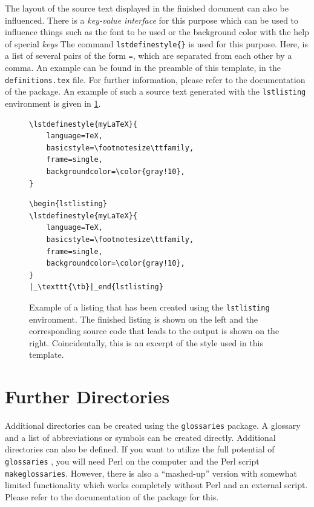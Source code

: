 The layout of the source text displayed in the finished document can also be 
influenced. There is a  \emph{key-value interface} for this purpose which can be 
used to influence things such as the font to be used or the background color 
with the help of special \emph{keys} The command
\texttt{\tb lstdefinestyle\{\}} is used for this purpose. Here, 
 is a list of several pairs of the form 
\texttt{=}, which are separated from each other by a 
comma. An example can be found in the preamble of this template, in the 
\texttt{definitions.tex} file. For further information, please refer to the 
documentation of the package. An example of such a source text generated with 
the \texttt{lstlisting} environment is given in  \cref{fig:listing}.
%
\begin{figure}[htb]
	\centering
	\begin{minipage}{.485\textwidth}
		\begin{lstlisting}
\lstdefinestyle{myLaTeX}{
	language=TeX,
	basicstyle=\footnotesize\ttfamily,
	frame=single,
	backgroundcolor=\color{gray!10},
}
		\end{lstlisting}
	\end{minipage}
	\hfill
	\begin{minipage}{.485\textwidth}
		\begin{lstlisting}[style=myBasic]
\begin{lstlisting}
\lstdefinestyle{myLaTeX}{
	language=TeX,
	basicstyle=\footnotesize\ttfamily,
	frame=single,
	backgroundcolor=\color{gray!10},
}
|_\texttt{\tb}|_end{lstlisting}
		\end{lstlisting}
	\end{minipage}
	\caption[Example of a listing]{%
		Example of a listing that has been created using the 
		\texttt{lstlisting} environment. The finished listing is shown on the 
		left and the corresponding source code that leads to the output is shown 
		on the right. Coincidentally, this is an excerpt of the style used in 
		this template.
	}\label{fig:listing}
\end{figure}
%
%
\section{Further Directories}
Additional directories can be created using the \texttt{glossaries} package. A 
glossary and a list of abbreviations or symbols can be created directly. 
Additional directories can also be defined. If you want to utilize the full 
potential of \texttt{glossaries} , you will need Perl on the computer and the 
Perl script \texttt{makeglossaries}. However, there is also a  
\enquote{mashed-up} version with somewhat limited functionality which works 
completely without Perl and an external script. Please refer to the 
documentation of the package for this.

